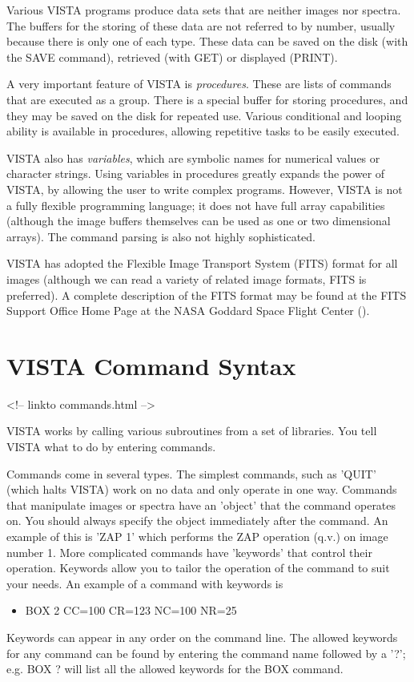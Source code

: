 Various VISTA programs produce data sets that are neither images nor
spectra.  The buffers for the storing of these data are not referred to by
number, usually because there is only one of each type.  These data can be
saved on the disk (with the SAVE command), retrieved (with GET) or
displayed (PRINT).

A very important feature of VISTA is \textit{procedures}.  These are lists
of commands that are executed as a group.  There is a special buffer for
storing procedures, and they may be saved on the disk for repeated
use. Various conditional and looping ability is available in procedures,
allowing repetitive tasks to be easily executed.

VISTA also has \textit{variables}, which are symbolic names for numerical
values or character strings.  Using variables in procedures greatly expands
the power of VISTA, by allowing the user to write complex
programs. However, VISTA is not a fully flexible programming language; it
does not have full array capabilities (although the image buffers
themselves can be used as one or two dimensional arrays). The command
parsing is also not highly sophisticated.

VISTA has adopted the Flexible Image Transport System (FITS) format for all
images (although we can read a variety of related image formats, FITS is
preferred).  A complete description of the FITS format may be found at the
FITS Support Office Home Page at the NASA Goddard Space Flight Center
().

\section{VISTA Command Syntax}
\begin{rawhtml}
<!-- linkto commands.html -->
\end{rawhtml}

VISTA works by calling various subroutines from a set of libraries. You
tell VISTA what to do by entering commands.

Commands come in several types.  The simplest commands, such as 'QUIT'
(which halts VISTA) work on no data and only operate in one way. Commands
that manipulate images or spectra have an 'object' that the command
operates on.  You should always specify the object immediately after the
command.  An example of this is 'ZAP 1' which performs the ZAP operation
(q.v.) on image number 1. More complicated commands have 'keywords' that
control their operation.  Keywords allow you to tailor the operation of the
command to suit your needs. An example of a command with keywords is
\begin{itemize}
   \item{BOX 2 CC=100 CR=123 NC=100 NR=25}
\end{itemize}
Keywords can appear in any order on the command line. The allowed keywords
for any command can be found by entering the command name followed by a
'?'; e.g.  BOX ? will list all the allowed keywords for the BOX command.

